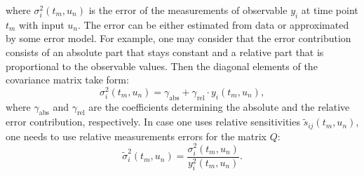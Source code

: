\documentclass[10pt,A4paper]{article}
\begin{document}
where $\sigma_{i}^2 (t_m, u_n)$ is the error of the measurements of observable $y_i$ at time point $t_m$ with input $u_n$.
The error can be either estimated from data or approximated by some error model.
For example, one may consider that the error contribution consists of an absolute part that stays constant and a relative part that is proportional to the observable values.
Then the diagonal elements of the covariance matrix take form:
\begin{equation}
\label{eq:error_model}
    \sigma_{i}^2 (t_m, u_n) = \gamma_\text{abs} + \gamma_\text{rel} \cdot y_i(t_m, u_n),
\end{equation}
where $\gamma_\text{abs}$ and $\gamma_\text{rel}$ are the coefficients determining the absolute and the relative error contribution, respectively.
In case one uses relative sensitivities $\tilde{s}_{ij} (t_m, u_n)$, one needs to use relative measurements errors for the matrix $Q$:
\begin{equation}
    \tilde{\sigma}_{i}^2 (t_m, u_n) = \frac{\sigma_{i}^2 (t_m, u_n)}{y^2_i(t_m, u_n)}.
\end{equation}
%
\end{document}
